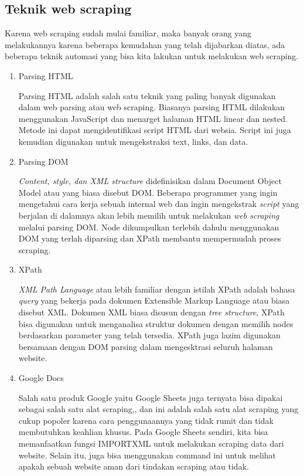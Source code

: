 \subsection{Teknik web scraping}
Karena web scraping sudah mulai familiar, maka banyak orang yang melakukannya karena beberapa kemudahan yang telah dijabarkan diatas, ada beberapa teknik automasi yang bisa kita lakukan untuk melakukan web scraping.
\begin{enumerate}

\item Parsing HTML

Parsing HTML adalah salah satu teknik yang paling banyak digunakan dalam web parsing atau web scraping. Biasanya parsing HTML dilakukan menggunakan JavaScript dan menarget halaman HTML linear dan nested. Metode ini dapat mengidentifikasi script HTML dari websia. Script ini juga kemudian digunakan untuk mengekstraksi text, links, dan data.

\item Parsing DOM

\textit{Content, style, dan XML structure} didefinisikan dalam Document Object Model atau yang biasa disebut DOM. Beberapa programmer yang ingin mengetahui cara kerja sebuah internal web dan ingin mengekstrak \textit{script} yang berjalan di dalamnya akan lebih memilih untuk melakukan \textit{web scraping} melalui parsing DOM. Node dikumpulkan terlebih dahulu menggunakan DOM yang terlah diparsing dan XPath membantu mempermudah proses scraping.

\item XPath

\textit{XML Path Language} atau lebih familiar dengan istilah XPath adalah bahasa \textit{query} yang bekerja pada dokumen Extensible Markup Language atau biasa disebut XML. Dokumen XML biasa disusun dengan \textit{tree structure}, XPath bisa digunakan untuk menganalisa struktur dokumen dengan memilih nodes berdasarkan parameter yang telah tersedia. XPath juga lazim digunakan bersamaan dengan DOM parsing dalam mengesktrasi seluruh halaman website.

\item Google Docs

Salah satu produk Google yaitu Google Sheets juga ternyata bisa dipakai sebagai salah satu alat scraping,, dan ini adalah salah satu alat scraping yang cukup popoler karena cara penggunaannya yang tidak rumit dan tidak membutuhkan keahlian khusus. Pada Google Sheets sendiri, kita bisa memanfaatkan fungsi IMPORTXML untuk melakukan scraping data dari website. Selain itu, juga bisa menggunakan command ini untuk melihat apakah sebuah website aman dari tindakan scraping atau tidak.
\end{enumerate}

